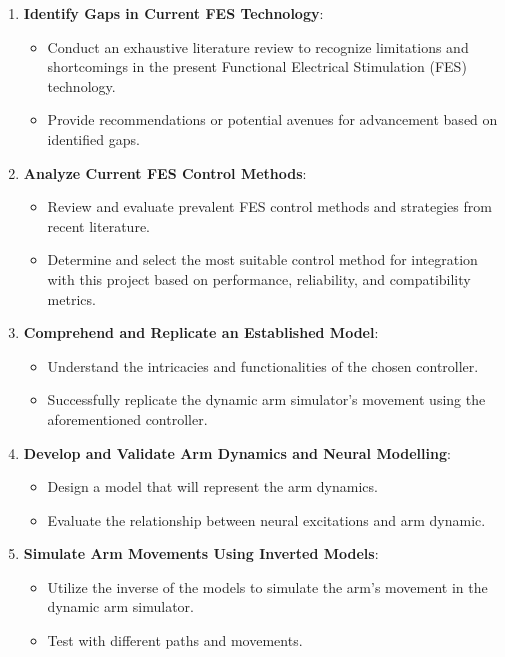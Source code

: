 \begin{enumerate}[label=\textbf{Goal \arabic*.}]

    \item \textbf{Identify Gaps in Current FES Technology}:
    \begin{itemize}
        \item Conduct an exhaustive literature review to recognize limitations and shortcomings in the present Functional Electrical Stimulation (FES) technology.
        \item Provide recommendations or potential avenues for advancement based on identified gaps.
    \end{itemize}
    
      \item \textbf{Analyze Current FES Control Methods}:
    \begin{itemize}
        \item Review and evaluate prevalent FES control methods and strategies from recent literature.
        \item Determine and select the most suitable control method for integration with this project based on performance, reliability, and compatibility metrics.
    \end{itemize}
    
    \item \textbf{Comprehend and Replicate an Established Model}:
    \begin{itemize}
        \item Understand the intricacies and functionalities of the chosen controller.
        \item Successfully replicate the dynamic arm simulator's movement using the aforementioned controller.
    \end{itemize}

    \item \textbf{Develop and Validate Arm Dynamics and Neural Modelling}:
    \begin{itemize}
        \item Design a model that will represent the arm dynamics.
        \item Evaluate the relationship between neural excitations and arm dynamic.
    \end{itemize}
    
    \item \textbf{Simulate Arm Movements Using Inverted Models}:
    \begin{itemize}
        \item Utilize the inverse of the models to simulate the arm's movement in the dynamic arm simulator.
        \item Test with different paths and movements.
    \end{itemize}
    

\end{enumerate}
